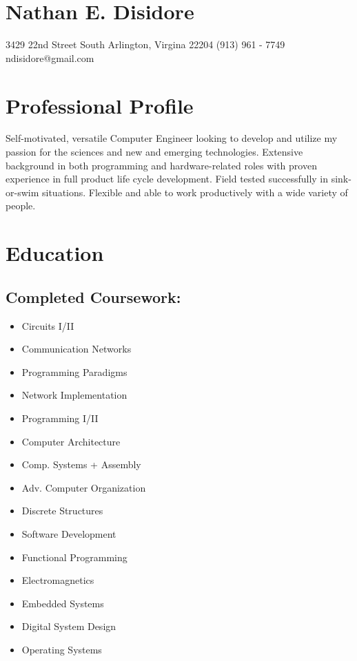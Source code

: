 \documentclass[10pt]{article}
\begin{document}
\pagestyle{empty} %

\section*{\Huge Nathan E. Disidore}
\begin{justify}
  3429 22nd Street South Arlington, Virgina 22204 (913) 961 - 7749 ndisidore@gmail.com
\end{justify}

\section*{Professional Profile}
Self-motivated, versatile Computer Engineer looking to develop and utilize my passion for the sciences and new and emerging technologies. Extensive background in both programming and hardware-related roles with proven experience in full product life cycle development. Field tested successfully in sink-or-swim situations. Flexible and able to work productively with a wide variety of people.

\section*{Education}
\subsection*{Completed Coursework:}
\begin{multicols}{4}
  \begin{itemize}
    \item Circuits I/II
    \item Communication Networks
    \item Programming Paradigms
    \item Network Implementation
    \item Programming I/II
    \item Computer Architecture
    \item Comp. Systems + Assembly
    \item Adv. Computer Organization
    \item Discrete Structures
    \item Software Development
    \item Functional Programming
    \item Electromagnetics
    \item Embedded Systems
    \item Digital System Design
    \item Operating Systems
  \end{itemize}
\end{multicols}
\end{document}
